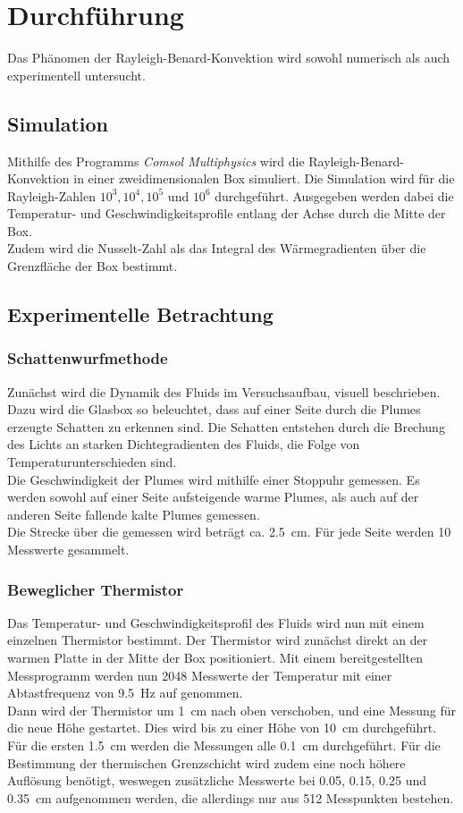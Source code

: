 \section{Durchführung}
Das Phänomen der Rayleigh-Benard-Konvektion wird sowohl numerisch als auch experimentell untersucht.
\subsection{Simulation}
Mithilfe des Programms \emph{Comsol Multiphysics} wird die Rayleigh-Benard-Konvektion in einer zweidimensionalen Box simuliert. 
Die Simulation wird für die Rayleigh-Zahlen $10^3, 10^4, 10^5$ und $10^6$ durchgeführt. 
Ausgegeben werden dabei die Temperatur- und Geschwindigkeitsprofile entlang der Achse durch die Mitte der Box.
\\
Zudem wird die Nusselt-Zahl als das Integral des Wärmegradienten über die Grenzfläche der Box bestimmt.

\subsection{Experimentelle Betrachtung}
\subsubsection{Schattenwurfmethode}
Zunächst wird die Dynamik des Fluids im Versuchsaufbau, visuell beschrieben.
Dazu wird die Glasbox so beleuchtet, dass auf einer Seite durch die Plumes erzeugte Schatten zu erkennen sind.
Die Schatten entstehen durch die Brechung des Lichts an starken Dichtegradienten des Fluids, die Folge von Temperaturunterschieden sind.
\\
Die Geschwindigkeit der Plumes wird mithilfe einer Stoppuhr gemessen. 
Es werden sowohl auf einer Seite aufsteigende warme Plumes, als auch auf der anderen Seite fallende kalte Plumes gemessen.
\\
Die Strecke über die gemessen wird beträgt ca. 2.5~cm. Für jede Seite werden 10 Messwerte gesammelt.
\subsubsection{Beweglicher Thermistor}
Das Temperatur- und Geschwindigkeitsprofil des Fluids wird nun mit einem einzelnen Thermistor bestimmt.
Der Thermistor wird zunächst direkt an der warmen Platte in der Mitte der Box positioniert. 
Mit einem bereitgestellten Messprogramm werden nun 2048 Messwerte der Temperatur mit einer Abtastfrequenz von 9.5~Hz auf genommen. 
\\ 
Dann wird der Thermistor um 1~cm nach oben verschoben, und eine Messung für die neue Höhe gestartet. Dies wird bis zu einer Höhe von 10~cm durchgeführt.
\\
Für die ersten 1.5~cm werden die Messungen alle 0.1~cm durchgeführt. 
Für die Bestimmung der thermischen Grenzschicht wird zudem eine noch höhere Auflösung benötigt, weswegen zusätzliche Messwerte bei 0.05, 0.15, 0.25 und 0.35~cm aufgenommen werden, die allerdings nur aus 512 Messpunkten bestehen.

